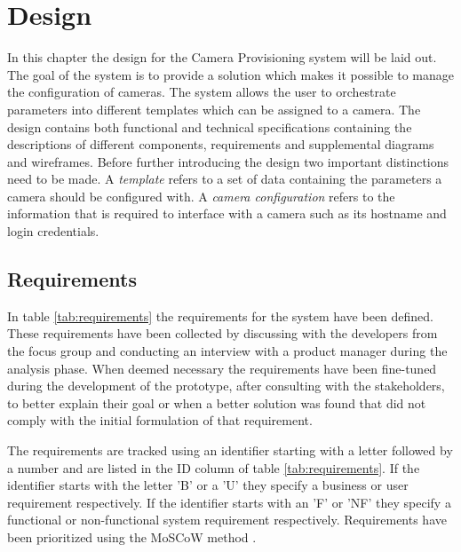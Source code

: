 \chapter{Design}
\label{sec:design}
In this chapter the design for the Camera Provisioning system will be laid out.
The goal of the system is to provide a solution which makes it possible to manage the configuration of cameras.
The system allows the user to orchestrate parameters into different templates which can be assigned to a camera.
The design contains both functional and technical specifications containing the descriptions of different components, requirements and supplemental diagrams and wireframes.
Before further introducing the design two important distinctions need to be made.
A \textit{template} refers to a set of data containing the parameters a camera should be configured with.
A \textit{camera configuration} refers to the information that is required to interface with a camera such as its hostname and login credentials.

\section{Requirements}
In table \ref{tab:requirements} the requirements for the system have been defined.
These requirements have been collected by discussing with the developers from the focus group and conducting an interview with a product manager during the analysis phase.
When deemed necessary the requirements have been fine-tuned during the development of the prototype, after consulting with the stakeholders, to better explain their goal or when a better solution was found that did not comply with the initial formulation of that requirement.

The requirements are tracked using an identifier starting with a letter followed by a number and are listed in the ID column of table \ref{tab:requirements}.
If the identifier starts with the letter 'B' or a 'U' they specify a business or user requirement respectively.
If the identifier starts with an 'F' or 'NF' they specify a functional or non-functional system requirement respectively.
Requirements have been prioritized using the MoSCoW method \cite{noauthor_moscow_nodate}.

